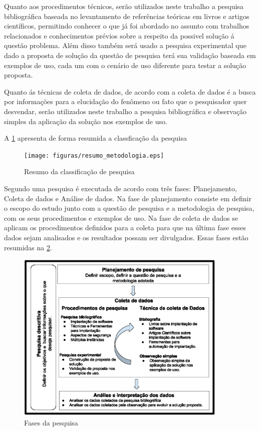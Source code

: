 Quanto aos procedimentos técnicos, serão utilizados neste trabalho a pesquisa bibliográfica
baseada no levantamento de referências teóricas em livros e artigos científicos, permitindo
conhecer o que já foi abordado no assunto com trabalhos relacionados e
conhecimentos prévios sobre a respeito da possivel solução á questão problema.
Além disso também será usado a pesquisa experimental que dado a proposta de solução
da questão de pesquisa terá sua validação baseada em exemplos de uso,
cada um com o cenário de uso diferente para testar a solução proposta.

Quanto ás técnicas de coleta de dados, de acordo com \cite{gerhardt2009metodos}
a coleta de dados é a busca por informações para a elucidação do fenômeno ou
fato que o pesquisador quer desvendar, serão utilizados neste trabalho a pesquisa
bibliográfica e observação simples da aplicação da solução nos exemplos de uso.

A \ref{fig:metodologia1} apresenta de forma resumida a classficação da pesquisa

\begin{figure}[h]
  \centering
  \texttt{[image: figuras/resumo\_metodologia.eps]}
  \caption{Resumo da classificação de pesquisa}
  \label{fig:metodologia1}
\end{figure}

Segundo \cite{andre2008estudo} uma pesquisa é executada de acordo com três fases:
Planejamento, Coleta de dados e Análise de dados. Na fase de planejamento consiste
em definir o escopo do estudo junto com a questão de pesquisa e a metodologia
de pesquisa, com os seus procedimentos e exemplos de uso. Na fase de coleta de dados
se aplicam os procedimentos definidos para a coleta para que na última fase esses
dados sejam analisados e os resultados possam ser divulgados. Essas fases estão
resumidas na \ref{fig:metodologia2}.

\begin{figure}[h]
  \centering
  \includegraphics[width=0.9\textwidth]
      {figuras/metodologia2.eps}
  \caption{Fases da pesquisa}
  \label{fig:metodologia2}
\end{figure}

